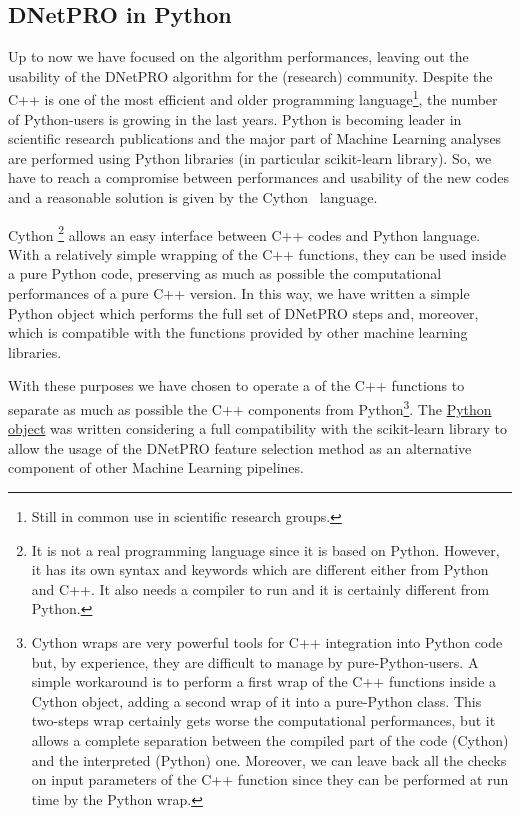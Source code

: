 \documentclass{standalone}
\begin{document}
\subsection[Python wrap]{DNetPRO in Python}\label{implementation:python}

Up to now we have focused on the algorithm performances, leaving out the usability of the \textsf{DNetPRO} algorithm for the (research) community.
Despite the \textsf{C++} is one of the most efficient and older programming language\footnote{
  Still in common use in scientific research groups.
}, the number of \textsf{Python}-users is growing in the last years.
\textsf{Python} is becoming leader in scientific research publications and the major part of Machine Learning analyses are performed using \textsf{Python} libraries (in particular \textsf{scikit-learn} library).
So, we have to reach a compromise between performances and usability of the new codes and a reasonable solution is given by the \textsf{Cython}~\cite{behnel2010cython} language.

\textsf{Cython} \footnote{
  It is not a real programming language since it is based on \textsf{Python}.
  However, it has its own syntax and keywords which are different either from \textsf{Python} and \textsf{C++}.
  It also needs a compiler to run and it is certainly different from \textsf{Python}.
} allows an easy interface between \textsf{C++} codes and \textsf{Python} language.
With a relatively simple wrapping of the \textsf{C++} functions, they can be used inside a pure \textsf{Python} code, preserving as much as possible the computational performances of a pure \textsf{C++} version.
In this way, we have written a simple \textsf{Python} object which performs the full set of \textsf{DNetPRO} steps and, moreover, which is compatible with the functions provided by other machine learning libraries.

With these purposes we have chosen to operate a  of the \textsf{C++} functions to separate as much as possible the \textsf{C++} components from \textsf{Python}\footnote{
  \textsf{Cython} wraps are very powerful tools for \textsf{C++} integration into \textsf{Python} code but, by experience, they are difficult to manage by pure-\textsf{Python}-users.
  A simple workaround is to perform a first wrap of the \textsf{C++} functions inside a \textsf{Cython} object, adding a second wrap of it into a pure-\textsf{Python} class.
  This two-steps wrap certainly gets worse the computational performances, but it allows a complete separation between the compiled part of the code (\textsf{Cython}) and the interpreted (\textsf{Python}) one.
  Moreover, we can leave back all the checks on input parameters of the \textsf{C++} function since they can be performed at run time by the \textsf{Python} wrap.
}.
The \href{https://github.com/Nico-Curti/DNetPRO/blob/master/DNetPRO/DNetPRO.py}{\textsf{Python} object} was written considering a full compatibility with the \textsf{scikit-learn} library to allow the usage of the \textsf{DNetPRO} feature selection method as an alternative component of other Machine Learning pipelines.
\end{document}

